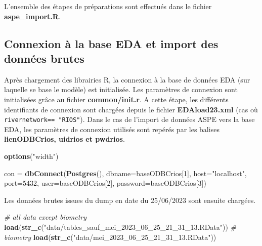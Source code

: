 \documentclass[]{template/RapportPole}
\newenvironment{Shaded}{\begin{snugshade}}{\end{snugshade}}
\newcommand{\AttributeTok}[1]{\textcolor[rgb]{0.13,0.29,0.53}{#1}}
\newcommand{\CommentTok}[1]{\textcolor[rgb]{0.56,0.35,0.01}{\textit{#1}}}
\newcommand{\DecValTok}[1]{\textcolor[rgb]{0.00,0.00,0.81}{#1}}
\newcommand{\FunctionTok}[1]{\textcolor[rgb]{0.13,0.29,0.53}{\textbf{#1}}}
\newcommand{\NormalTok}[1]{#1}
\newcommand{\OtherTok}[1]{\textcolor[rgb]{0.56,0.35,0.01}{#1}}
\newcommand{\StringTok}[1]{\textcolor[rgb]{0.31,0.60,0.02}{#1}}
\begin{document}
L'ensemble des étapes de préparations sont effectués dans le fichier \textbf{aspe\_import.R}.

\hypertarget{connexion-uxe0-la-base-eda-et-import-des-donnuxe9es-brutes}{%
\subsection{Connexion à la base EDA et import des données brutes}\label{connexion-uxe0-la-base-eda-et-import-des-donnuxe9es-brutes}}

Après chargement des librairies R, la connexion à la base de données EDA (sur laquelle se base le modèle) est initialisée. Les paramètres de connexion sont initialisées grâce au fichier \textbf{common/init.r}. A cette étape, les différents identifiants de connexion sont chargées depuis le fichier \textbf{EDAload23.xml} (cas où \texttt{rivernetwork==\ "RIOS"}). Dans le cas de l'import de données ASPE vers la base EDA, les paramètres de connexion utilisés sont repérés par les balises \textbf{lienODBCrios, uidrios et pwdrios}.

\begin{Shaded}
\begin{Highlighting}[]
\FunctionTok{options}\NormalTok{(}\StringTok{"width"}\NormalTok{)}

\NormalTok{con }\OtherTok{=} \FunctionTok{dbConnect}\NormalTok{(}\FunctionTok{Postgres}\NormalTok{(),}
        \AttributeTok{dbname=}\NormalTok{baseODBCrios[}\DecValTok{1}\NormalTok{],}
        \AttributeTok{host=}\StringTok{"localhost"}\NormalTok{,}
        \AttributeTok{port=}\DecValTok{5432}\NormalTok{,}
        \AttributeTok{user=}\NormalTok{baseODBCrios[}\DecValTok{2}\NormalTok{], }
        \AttributeTok{password=}\NormalTok{baseODBCrios[}\DecValTok{3}\NormalTok{])}
\end{Highlighting}
\end{Shaded}

Les données brutes issues du dump en date du 25/06/2023 sont ensuite chargées.

\begin{Shaded}
\begin{Highlighting}[]
\CommentTok{\# all data except biometry}
\FunctionTok{load}\NormalTok{(}\FunctionTok{str\_c}\NormalTok{(}\StringTok{"data/tables\_sauf\_mei\_2023\_06\_25\_21\_31\_13.RData"}\NormalTok{)) }
\CommentTok{\# biometry}
\FunctionTok{load}\NormalTok{(}\FunctionTok{str\_c}\NormalTok{(}\StringTok{"data/mei\_2023\_06\_25\_21\_31\_13.RData"}\NormalTok{))}
\end{Highlighting}
\end{Shaded}
\end{document}
